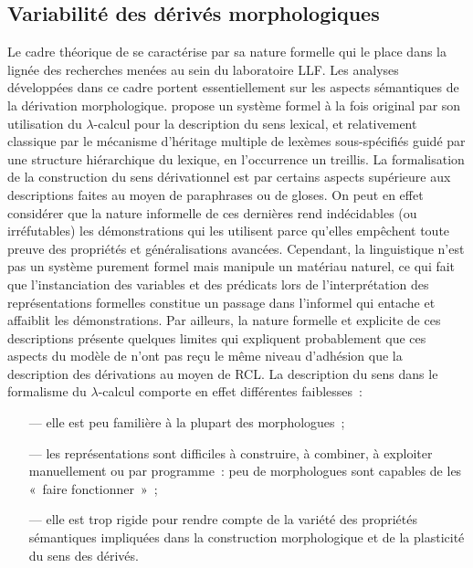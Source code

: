 \documentclass[output=paper]{langsci/langscibook}
\begin{document}
\subsection{Variabilité des dérivés morphologiques}
\label{sec:vari-des-deriv}

Le cadre théorique de \cite{Fradin03} se caractérise par sa nature formelle qui le place dans la lignée des recherches menées au sein du laboratoire LLF.  Les analyses développées dans ce cadre portent essentiellement sur les aspects sémantiques de la dérivation morphologique.  \cite{Fradin03}  propose un  système formel  à la fois  original par son utilisation  du $\lambda$-calcul pour la description du sens lexical, et relativement classique par le mécanisme d'héritage multiple de lexèmes sous-spécifiés guidé par une structure hiérarchique du lexique, en l'occurrence un treillis.
%
La formalisation de la construction du sens dérivationnel est par certains aspects supérieure aux descriptions faites au moyen de paraphrases ou de gloses.  On peut en effet considérer que la nature informelle de ces dernières rend indécidables (ou irréfutables) les démonstrations qui les utilisent  parce qu'elles empêchent toute preuve des propriétés et généralisations avancées.  Cependant, la linguistique n'est pas un système purement formel mais manipule un matériau naturel, ce qui fait que l'instanciation des variables et des prédicats lors de l'interprétation des représentations formelles constitue un passage dans l'informel qui entache et affaiblit les démonstrations.
%
Par ailleurs, la nature formelle et explicite de ces descriptions présente quelques limites qui expliquent probablement que ces aspects du modèle de \cite{Fradin03} n'ont pas reçu le même niveau d'adhésion que la description des dérivations au moyen de RCL.  La description du sens dans le formalisme du $\lambda$-calcul comporte en effet différentes faiblesses~:
\begin{itemize}
\item[---] elle est peu familière à la plupart des morphologues~;
\item[---] les représentations sont difficiles à construire, à combiner, à exploiter manuellement ou par programme~: peu de morphologues sont capables de les «~faire fonctionner~»~;
\item[---] elle est trop rigide pour rendre compte de la variété des propriétés sémantiques impliquées dans la construction morphologique et de la plasticité du sens des dérivés.
\end{itemize}
\end{document}
